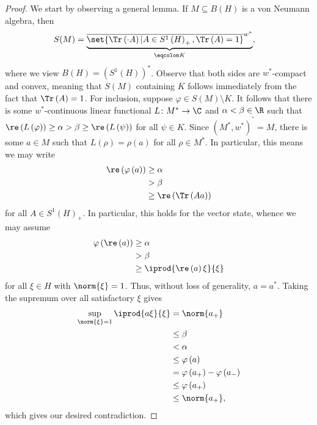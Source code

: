 \documentclass[10pt]{mypackage}
\begin{document}
\begin{proof}
  We start by observing a general lemma. If $M\subseteq B(H)$ is a von Neumann algebra, then
  \begin{align*}
    S(M) &= \underbrace{\overline{\set{\Tr\left( \cdot A \right) | A\in S^1\left( H \right)_{+},\Tr\left( A \right) = 1}}^{w^{\ast}}}_{\eqcolon K},
  \end{align*}
  where we view $B(H) = \left( S^1\left( H \right) \right)^{\ast}$. Observe that both sides are $w^{\ast}$-compact and convex, meaning that $S(M)$ containing $K$ follows immediately from the fact that $\Tr\left( A \right) = 1$. For inclusion, suppose $\varphi\in S(M)\setminus K$. It follows that there is some $w^{\ast}$-continuous linear functional $L\colon M^{\ast}\rightarrow \C$ and $\alpha < \beta \in \R$ such that $\re\left( L\left( \varphi \right) \right) \geq \alpha > \beta \geq \re\left( L\left( \psi \right) \right)$ for all $\psi\in K$. Since $\left( M^{\ast},w^{\ast} \right)^{^{\ast}} = M$, there is some $a\in M$ such that $L\left( \rho \right) = \rho\left( a \right)$ for all $\rho\in M^{\ast}$. In particular, this means we may write
  \begin{align*}
    \re\left( \varphi\left( a \right) \right) &\geq \alpha\\
                                              &> \beta\\
                                              &\geq \re\left( \Tr\left( Aa \right) \right)
  \end{align*}
  for all $A\in S^1\left( H \right)_{+}$. In particular, this holds for the vector state, whence we may assume
  \begin{align*}
    \varphi\left( \re\left( a \right) \right) &\geq \alpha\\
                                              &> \beta\\
                                              &\geq \iprod{\re\left( a \right)\xi}{\xi}
  \end{align*}
  for all $\xi\in H$ with $\norm{\xi}=  1$. Thus, without loss of generality, $a = a^{\ast}$. Taking the supremum over all satisfactory $\xi$ gives
  \begin{align*}
    \sup_{\norm{\xi} = 1} \iprod{a\xi}{\xi} &= \norm{a_{+}}\\
                                            &\leq \beta\\
                                            &< \alpha\\
                                            &\leq \varphi\left( a \right)\\
                                            &= \varphi\left( a_{+} \right) - \varphi\left( a_{-} \right)\\
                                            &\leq \varphi\left( a_{+} \right)\\
                                            &\leq \norm{a_{+}},
  \end{align*}
  which gives our desired contradiction.


\end{proof}
\end{document}
